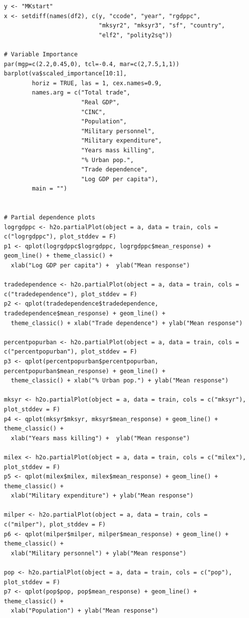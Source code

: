 \begin{verbatim}
y <- "MKstart"
x <- setdiff(names(df2), c(y, "ccode", "year", "rgdppc",
                           "mksyr2", "mksyr3", "sf", "country",
                           "elf2", "polity2sq"))  

# Variable Importance
par(mgp=c(2.2,0.45,0), tcl=-0.4, mar=c(2,7.5,1,1))
barplot(va$scaled_importance[10:1],
        horiz = TRUE, las = 1, cex.names=0.9,
        names.arg = c("Total trade",
                      "Real GDP",
                      "CINC",
                      "Population", 
                      "Military personnel",
                      "Military expenditure",
                      "Years mass killing",
                      "% Urban pop.",
                      "Trade dependence", 
                      "Log GDP per capita"),
        main = "")


# Partial dependence plots
logrgdppc <- h2o.partialPlot(object = a, data = train, cols = c("logrgdppc"), plot_stddev = F)
p1 <- qplot(logrgdppc$logrgdppc, logrgdppc$mean_response) + geom_line() + theme_classic() +
  xlab("Log GDP per capita") +  ylab("Mean response")

tradedependence <- h2o.partialPlot(object = a, data = train, cols = c("tradedependence"), plot_stddev = F)
p2 <- qplot(tradedependence$tradedependence, tradedependence$mean_response) + geom_line() +
  theme_classic() + xlab("Trade dependence") + ylab("Mean response")

percentpopurban <- h2o.partialPlot(object = a, data = train, cols = c("percentpopurban"), plot_stddev = F)
p3 <- qplot(percentpopurban$percentpopurban, percentpopurban$mean_response) + geom_line() +
  theme_classic() + xlab("% Urban pop.") + ylab("Mean response")

mksyr <- h2o.partialPlot(object = a, data = train, cols = c("mksyr"), plot_stddev = F)
p4 <- qplot(mksyr$mksyr, mksyr$mean_response) + geom_line() + theme_classic() +
  xlab("Years mass killing") +  ylab("Mean response")

milex <- h2o.partialPlot(object = a, data = train, cols = c("milex"), plot_stddev = F)
p5 <- qplot(milex$milex, milex$mean_response) + geom_line() + theme_classic() +
  xlab("Military expenditure") + ylab("Mean response")

milper <- h2o.partialPlot(object = a, data = train, cols = c("milper"), plot_stddev = F)
p6 <- qplot(milper$milper, milper$mean_response) + geom_line() + theme_classic() +
  xlab("Military personnel") + ylab("Mean response")

pop <- h2o.partialPlot(object = a, data = train, cols = c("pop"), plot_stddev = F)
p7 <- qplot(pop$pop, pop$mean_response) + geom_line() + theme_classic() +
  xlab("Population") + ylab("Mean response")


\end{verbatim}
